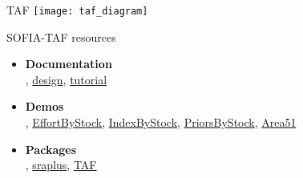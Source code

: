 \documentclass[aspectratio=169]{beamer}
\begin{document}

\begin{frame}{TAF}
  \centering
  \texttt{[image: taf\_diagram]}
\end{frame}


\begin{frame}[plain]
\end{frame}


\begin{frame}[plain]
\end{frame}


\begin{frame}{SOFIA-TAF resources}
  \begin{itemize}
    \item[] {\bf\darkgray Documentation}\\[0.5ex]
    ,
    {\blue\href{https://arni-magnusson.github.io/pdf/2021-sofia-taf.pdf}{design}},
    {\blue\href{https://github.com/sofia-taf/doc/blob/main/sofia_taf_tutorial.md}{tutorial}}\\[5ex]
    \item[] {\bf\darkgray Demos}\\[0.5ex]
    ,
    {\blue\href{https://github.com/sofia-taf/2022Area31EffortByStock}{EffortByStock}},
    {\blue\href{https://github.com/sofia-taf/2022Area31IndexByStock}{IndexByStock}},
    {\blue\href{https://github.com/sofia-taf/2022Area41PriorsByStock}{PriorsByStock}},
    {\blue\href{https://github.com/sofia-taf/2023Area51Demo}{Area51}}\\[5ex]
    \item[] {\bf\darkgray Packages}\\[0.5ex]
    ,
    {\blue\href{https://github.com/DanOvando/sraplus}{sraplus}},
    {\blue\href{https://github.com/ices-tools-prod/TAF}{TAF}}
  \end{itemize}
\end{frame}
\end{document}
